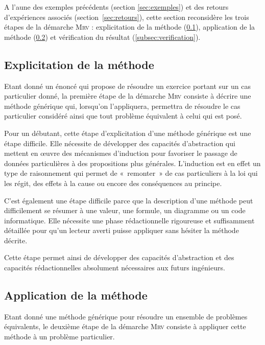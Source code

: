 A l'aune des exemples précédents (section \ref{sec:exemples}) et des retours d'expériences associés (section~\ref{sec:retours}), 
cette section reconsidère les trois étapes de la démarche \textsc{Mrv} : 
explicitation de la méthode (\ref{subsec:methode}), 
application de la méthode (\ref{subsec:resultat}) et 
vérification du résultat (\ref{subsec:verification}).

\subsection{Explicitation de la méthode}\label{subsec:methode}
Etant donné un énoncé qui propose de résoudre un exercice
portant sur un cas particulier donné, la première étape de la démarche \textsc{Mrv} consiste à
décrire une méthode générique qui, lorsqu'on l'appliquera, permettra de résoudre 
le cas particulier considéré ainsi que tout problème équivalent à celui 
qui est posé.

Pour un débutant, cette étape d'explicitation d'une méthode générique est une étape  
difficile. Elle nécessite de développer des capacités 
d'abstraction qui mettent en \oe uvre des mécanismes d'induction 
pour favoriser le passage de données particulières à des propositions plus générales.
L'induction est en effet un type de raisonnement qui permet de «~remonter~»
de cas particuliers à la loi qui les régit, des effets à la cause ou encore des conséquences au principe.

C'est également une étape difficile parce que la description d'une méthode peut 
difficilement se résumer à une valeur, une formule, un diagramme ou un code
informatique.
Elle nécessite une phase rédactionnelle rigoureuse et suffisamment détaillée pour
qu'un lecteur averti puisse appliquer sans hésiter la méthode décrite.

Cette étape permet ainsi de développer des capacités d'abstraction et
des capacités rédactionnelles absolument nécessaires aux futurs ingénieurs.

\subsection{Application de la méthode}\label{subsec:resultat}
Etant donné une méthode générique pour résoudre un ensemble de problèmes 
équivalents, le deuxième étape de la démarche \textsc{Mrv} consiste à
appliquer cette méthode à un problème particulier.

